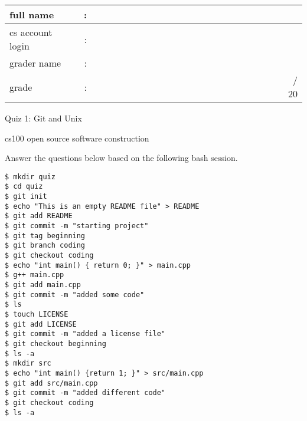 \documentclass{article}
\begin{document}
\renewcommand{\arraystretch}{2}
\hfill
\begin{tabular}{lcr}
full name & : &\\
\hline
cs account login & :  & \\
\hline
grader name & : & \\
\hline
grade & : & ~~~~~~~~~~~~~~~~~~~~~~~~~~~~~~~~~~~~~~~/ 20\\
\hline
\end{tabular}

\vspace{0.25in}
\begin{center}
{ \huge
Quiz 1: Git and Unix
}

{ \Large
cs100 open source software construction
}
\end{center}
\vspace{0.15in}


\noindent
Answer the questions below based on the following bash session.

\begin{lstlisting}
$ mkdir quiz
$ cd quiz
$ git init
$ echo "This is an empty README file" > README
$ git add README
$ git commit -m "starting project"
$ git tag beginning
$ git branch coding
$ git checkout coding
$ echo "int main() { return 0; }" > main.cpp
$ g++ main.cpp
$ git add main.cpp
$ git commit -m "added some code"
$ ls
$ touch LICENSE
$ git add LICENSE
$ git commit -m "added a license file"
$ git checkout beginning
$ ls -a
$ mkdir src
$ echo "int main() {return 1; }" > src/main.cpp
$ git add src/main.cpp
$ git commit -m "added different code"
$ git checkout coding
$ ls -a
\end{lstlisting}
\end{document}
